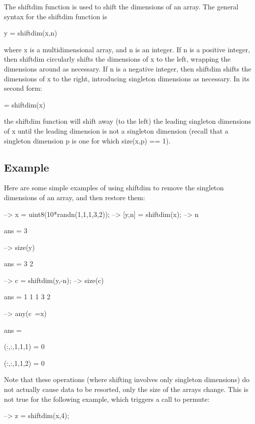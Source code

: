 The {\ttfamily shiftdim} function is used to shift the dimensions of an array. The general syntax for the {\ttfamily shiftdim} function is \begin{DoxyVerb}   y = shiftdim(x,n)
\end{DoxyVerb}
 where {\ttfamily x} is a multidimensional array, and {\ttfamily n} is an integer. If {\ttfamily n} is a positive integer, then {\ttfamily shiftdim} circularly shifts the dimensions of {\ttfamily x} to the left, wrapping the dimensions around as necessary. If {\ttfamily n} is a negative integer, then {\ttfamily shiftdim} shifts the dimensions of {\ttfamily x} to the right, introducing singleton dimensions as necessary. In its second form\-: \begin{DoxyVerb}  [y,n] = shiftdim(x)
\end{DoxyVerb}
 the {\ttfamily shiftdim} function will shift away (to the left) the leading singleton dimensions of {\ttfamily x} until the leading dimension is not a singleton dimension (recall that a singleton dimension {\ttfamily p} is one for which {\ttfamily size(x,p) == 1}). \hypertarget{variables_struct_Example}{}\subsection{Example}\label{variables_struct_Example}
Here are some simple examples of using {\ttfamily shiftdim} to remove the singleton dimensions of an array, and then restore them\-:


\begin{DoxyVerbInclude}
--> x = uint8(10*randn(1,1,1,3,2));
--> [y,n] = shiftdim(x);
--> n

ans = 
 3 

--> size(y)

ans = 
 3 2 

--> c = shiftdim(y,-n);
--> size(c)

ans = 
 1 1 1 3 2 

--> any(c~=x)

ans = 

(:,:,1,1,1) = 
 0 

(:,:,1,1,2) = 
 0 
\end{DoxyVerbInclude}


Note that these operations (where shifting involves only singleton dimensions) do not actually cause data to be resorted, only the size of the arrays change. This is not true for the following example, which triggers a call to {\ttfamily permute}\-:


\begin{DoxyVerbInclude}
--> z = shiftdim(x,4);
\end{DoxyVerbInclude}


